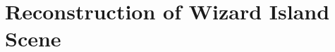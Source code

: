 \documentclass[11pt,psfig]{article}
\begin{document}
\section{Reconstruction of Wizard Island Scene}


\end{document}
